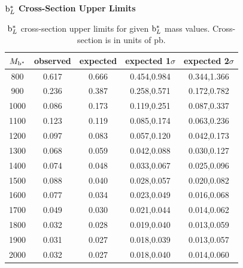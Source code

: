 \begin{table}[htcb]
\begin{center}
\bf{$\mathrm{b}^{*}_{L}$ Cross-Section Upper Limits}\\
\begin{tabular}{|c||c|c|c|c|}
\hline
\bf{$M_{\mathrm{b}^{*}}$} & \bf{observed}  & \bf{expected} & \bf{expected 1$\sigma$}  & \bf{expected 2$\sigma$} \\
\hline
\hline
800 & 0.617 & 0.666 & 0.454,0.984 & 0.344,1.366\\ 
\hline
900 & 0.236 & 0.387 & 0.258,0.571 & 0.172,0.782\\ 
\hline
1000 & 0.086 & 0.173 & 0.119,0.251 & 0.087,0.337\\ 
\hline
1100 & 0.123 & 0.119 & 0.085,0.174 & 0.063,0.236\\ 
\hline
1200 & 0.097 & 0.083 & 0.057,0.120 & 0.042,0.173\\ 
\hline
1300 & 0.068 & 0.059 & 0.042,0.088 & 0.030,0.127\\ 
\hline
1400 & 0.074 & 0.048 & 0.033,0.067 & 0.025,0.096\\ 
\hline
1500 & 0.088 & 0.040 & 0.028,0.057 & 0.020,0.082\\
\hline
1600 & 0.077 & 0.034 & 0.023,0.049 & 0.016,0.068\\ 
\hline
1700 & 0.049 & 0.030 & 0.021,0.044 & 0.014,0.062\\ 
\hline
1800 & 0.032 & 0.028 & 0.019,0.040 & 0.013,0.059\\ 
\hline
1900 & 0.031 & 0.027 & 0.018,0.039 & 0.013,0.057\\ 
\hline
2000 & 0.032 & 0.027 & 0.018,0.040 & 0.014,0.060\\ 
\hline
\end{tabular}
\end{center}
\caption{$\mathrm{b}^{*}_L$ cross-section upper limits for given $\mathrm{b}^{*}_L$ mass values.  Cross-section is in units of pb.}
\label{table:bsupperxsecL}
\end{table}



